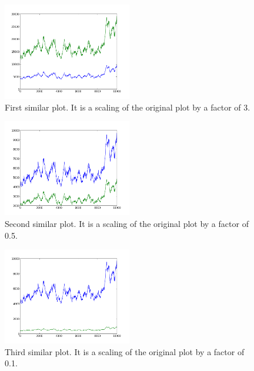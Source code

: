 \begin{figure}[h!]
    \centering
    \includegraphics[width=0.5\textwidth]{images/mutant_1.png}
    \caption{First similar plot.  It is a scaling of the original plot by a factor of 3.}
    \label{fig:mutant_1}
\end{figure}

\begin{figure}[h!]
    \centering
    \includegraphics[width=0.5\textwidth]{images/mutant_2.png}
    \caption{Second similar plot.  It is a scaling of the original plot by a factor of 0.5.}
    \label{fig:mutant_2}
\end{figure}

\begin{figure}[h!]
    \centering
    \includegraphics[width=0.5\textwidth]{images/mutant_3.png}
    \caption{Third similar plot.  It is a scaling of the original plot by a factor of 0.1.}
    \label{fig:mutant_3}
\end{figure}

